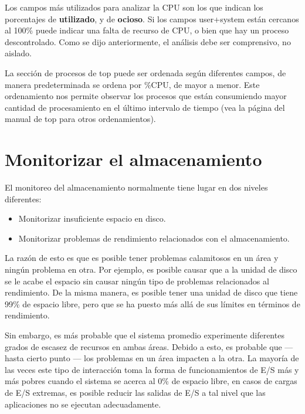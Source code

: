 \documentclass[12pt]{article}
\begin{document}

Los campos más utilizados para analizar la CPU son los que indican los 
porcentajes de \textbf{utilizado}, y de \textbf{ocioso}. Si los campos 
user+system están cercanos al 100\% puede indicar una falta de recurso de 
CPU, o bien que hay un proceso descontrolado. Como se dijo anteriormente, 
el análisis debe ser comprensivo, no aislado. 

La sección de procesos de top puede ser ordenada según diferentes campos, 
de manera predeterminada se ordena por \%CPU, de mayor a menor. Este 
ordenamiento nos permite observar los procesos que están consumiendo mayor
cantidad de procesamiento en el último intervalo de tiempo (vea la página
del manual de top para otros ordenamientos). 

\section*{Monitorizar el almacenamiento}
El monitoreo del almacenamiento normalmente tiene lugar en dos niveles 
diferentes:

\begin{itemize}
\item Monitorizar insuficiente espacio en disco.
\item Monitorizar problemas de rendimiento relacionados con el 
almacenamiento.
\end{itemize}

La razón de esto es que es posible tener problemas calamitosos en un área 
y ningún problema en otra. Por ejemplo, es posible causar que a la unidad 
de disco se le acabe el espacio sin causar ningún tipo de problemas 
relacionados al rendimiento. De la misma manera, es posible tener una 
unidad de disco que tiene 99\% de espacio libre, pero que se ha puesto más 
allá de sus límites en términos de rendimiento.

Sin embargo, es más probable que el sistema promedio experimente diferentes
 grados de escasez de recursos en ambas áreas. Debido a esto, es probable
 que — hasta cierto punto — los problemas en un área impacten a la otra. 
La mayoría de las veces este tipo de interacción toma la forma de 
funcionamientos de E/S más y más pobres cuando el sistema se acerca al
 0\% de espacio libre, en casos de cargas de E/S extremas, es posible 
reducir las salidas de E/S a tal nivel que las aplicaciones no se ejecutan 
adecuadamente.
\end{document}
